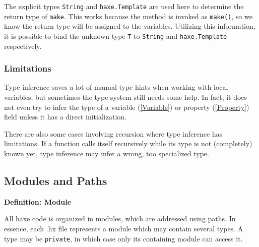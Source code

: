 \documentclass{article}
\newcommand{\type}[1]{\texttt{#1}}
\newcommand{\expr}[1]{\texttt{#1}}
\newenvironment{myshaded}
  {\def\FrameCommand{\fboxsep=\topsep\colorbox{bgcolor}}%
  \MakeFramed {\advance\hsize-\width \FrameRestore}}%
 {\endMakeFramed}
\newcommand{\define}[3][Definition]
	{\begin{myshaded}\noindent\textbf{#1: #2}\par\nobreak\noindent\ignorespaces#3\label{def:#2}\end{myshaded}}
\newcommand{\tref}[2]{#1 (\ref{#2})}
\newcommand{\haxe}[2][]{%
}
\begin{document}
\haxe{assets/GenericTypeParameter.hx}

The explicit types \type{String} and \type{haxe.Template} are used here to determine the return type of \expr{make}. This works because the method is invoked as \expr{make()}, so we know the return type will be assigned to the variables. Utilizing this information, it is possible to bind the unknown type \type{T} to \type{String} and \type{haxe.Template} respectively.





\subsubsection{Limitations}

Type inference saves a lot of manual type hints when working with local variables, but sometimes the type system still needs some help. In fact, it does not even try to infer the type of a \tref{variable}{Variable} or \tref{property}{Property} field unless it has a direct initialization.

There are also some cases involving recursion where type inference has limitations. If a function calls itself recursively while its type is not (completely) known yet, type inference may infer a wrong, too specialized type.




\subsection{Modules and Paths}
\label{Modules and Paths}
\define{Module}{All haxe code is organized in modules, which are addressed using paths. In essence, each .hx file represents a module which may contain several types. A type may be \expr{private}, in which case only its containing module can access it.}
\end{document}
